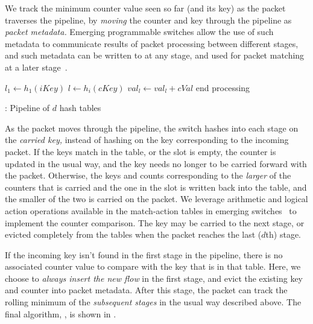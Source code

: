  We track the minimum counter value seen so
far (and its key) as the packet traverses the pipeline, by {\em moving} the
counter and key through the pipeline as {\em packet metadata.} Emerging
programmable switches allow the use of such metadata to communicate results of
packet processing between different stages, and such metadata can be written to
at any stage, and used for packet matching at a later stage~\cite{p4-v1.1-spec}.

\begin{algorithm}
\DontPrintSemicolon %
\;
$l_1 \gets h_1(iKey)$\;
\;
 {
$l \gets h_i(cKey)$\;
   {
    $val_l \gets val_l + cVal$\;
    end processing\;
  }
}
\caption{\TheSystem: Pipeline of $d$ hash tables}
\label{algo:Sequential}
\end{algorithm}

As the packet moves through the pipeline, the switch hashes into each stage on
the {\em carried key,} instead of hashing on the key corresponding to the
incoming packet. If the keys match in the table, or the slot is empty, the
counter is updated in the usual way, and the key needs no longer to be carried
forward with the packet. Otherwise, the keys and counts corresponding to the
{\em larger} of the counters that is carried and the one in the slot is written
back into the table, and the smaller of the two is carried on the packet. We
leverage arithmetic and logical action operations available in the match-action
tables in emerging switches~\cite{RMT} to implement the counter comparison. The
key may be carried to the next stage, or evicted completely from the tables when
the packet reaches the last (\ie $d$th) stage.

 If the incoming key isn't found in
the first stage in the pipeline, there is no associated counter value to compare
with the key that is in that table. Here, we choose to {\em always insert the
  new flow} in the first stage, and evict the existing key and counter into
packet metadata. After this stage, the packet can track the rolling minimum of
the {\em subsequent stages} in the usual way described above. The final
algorithm, \TheSystem, is shown in .

